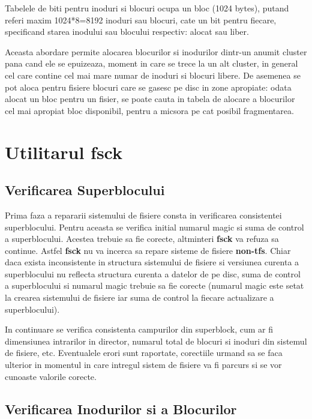 Tabelele de biti pentru inoduri si blocuri ocupa un bloc (1024 bytes),
putand referi maxim 1024*8=8192 inoduri sau blocuri, cate un bit
pentru fiecare, specificand starea inodului sau blocului respectiv:
alocat sau liber.

Aceasta abordare permite alocarea blocurilor si inodurilor dintr-un
anumit cluster pana cand ele se epuizeaza, moment in care se trece la
un alt cluster, in general cel care contine cel mai mare numar de
inoduri si blocuri libere.  De asemenea se pot aloca pentru fisiere
blocuri care se gasesc pe disc in zone apropiate: odata alocat un bloc
pentru un fisier, se poate cauta in tabela de alocare a blocurilor cel
mai apropiat bloc disponibil, pentru a micsora pe cat posibil
fragmentarea.


\section{Utilitarul fsck}


\subsection{Verificarea Superblocului}


Prima faza a repararii sistemului de fisiere consta in verificarea
consistentei superblocului.  Pentru aceasta se verifica initial
numarul magic si suma de control a superblocului.  Acestea trebuie sa
fie corecte, altminteri {\bf fsck} va refuza sa continue.  Astfel {\bf
fsck} nu va incerca sa repare sisteme de fisiere {\bf non-tfs}.  Chiar
daca exista inconsistente in structura sistemului de fisiere si
versiunea curenta a superblocului nu reflecta structura curenta a
datelor de pe disc, suma de control a superblocului si numarul magic
trebuie sa fie corecte (numarul magic este setat la crearea sistemului
de fisiere iar suma de control la fiecare actualizare a
superblocului).

In continuare se verifica consistenta campurilor din superblock, cum
ar fi dimensiunea intrarilor in director, numarul total de blocuri si
inoduri din sistemul de fisiere, etc.  Eventualele erori sunt
raportate, corectiile urmand sa se faca ulterior in momentul in care
intregul sistem de fisiere va fi parcurs si se vor cunoaste valorile
corecte.


\subsection{Verificarea Inodurilor si a Blocurilor}


